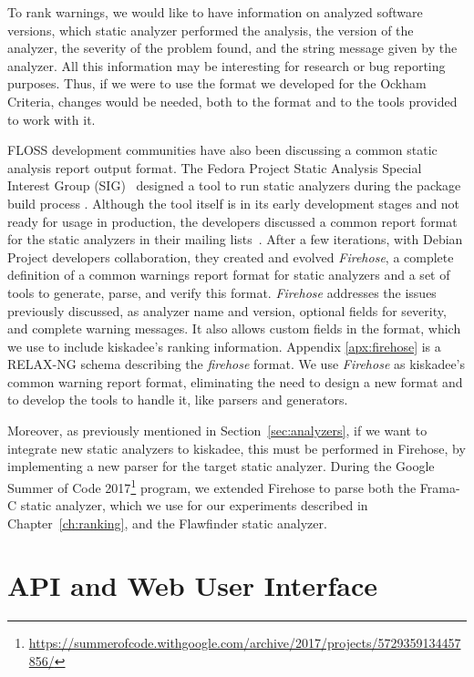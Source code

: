 To rank warnings, we would like to have information on analyzed software
versions, which static analyzer performed the analysis, the version of the
analyzer, the severity of the problem found, and the string message given by the
analyzer. All this information may be interesting for research or bug reporting
purposes. Thus, if we were to use the format we developed for the Ockham Criteria,
changes would be needed, both to the format and to the tools provided to work
with it.

FLOSS development communities have also been discussing a common static
analysis report output format. The Fedora Project Static Analysis Special
Interest Group (SIG)~\citep{fedora:static:sig} designed a tool to run static analyzers
during the
package build process \citep{fedora:mockwithanalysis}.  Although the tool itself
is in its early development stages and not ready for usage in production, the
developers discussed a common report format for the static
analyzers in their mailing lists~\citep{fedora:mlist}. After a few iterations, with Debian Project
developers collaboration, they created and evolved \textit{Firehose}, a complete definition
of a common warnings report format for static analyzers and a set of tools to
generate, parse, and verify this format.
\textit{Firehose} addresses the issues previously discussed, as analyzer name
and version, optional fields for severity, and complete warning messages. It also allows custom fields in the format, which we use to include kiskadee's ranking information.
Appendix \ref{apx:firehose} is a RELAX-NG schema describing the
\textit{firehose} format.
We use \textit{Firehose} as kiskadee's
common warning report format, eliminating the need to design a new format and
to develop the tools to handle it, like parsers and generators.

Moreover, as previously  mentioned in Section~\ref{sec:analyzers}, if we want
to integrate new static analyzers to kiskadee, this must be performed in
Firehose, by implementing a new parser for the target static analyzer. During
the Google Summer of Code
2017\footnote{\url{https://summerofcode.withgoogle.com/archive/2017/projects/5729359134457856/}} program, we extended
Firehose to parse both the Frama-C static analyzer, which we use for our
experiments described in Chapter~\ref{ch:ranking}, and the Flawfinder static
analyzer.

\section{API and Web User Interface}
\label{sec:api}

